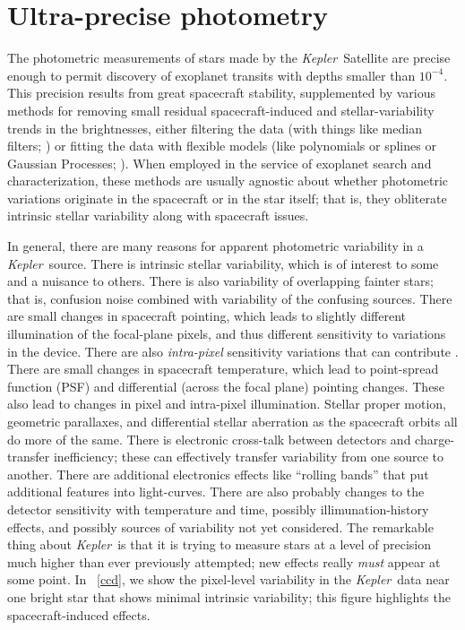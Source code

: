 \documentclass[12pt, preprint]{aastex}
\newcommand{\project}[1]{\textsl{#1}}
\newcommand{\Kepler}{\project{Kepler}}
\begin{document}
\section{Ultra-precise photometry}

The photometric measurements of stars made by the \Kepler\ Satellite are precise enough
  to permit discovery of exoplanet transits with depths smaller than $10^{-4}$.
This precision results from great spacecraft stability,
  supplemented by various methods for removing small residual spacecraft-induced and stellar-variability trends in the brightnesses,
  either filtering the data (with things like median filters; \cite{trendfilter})
  or fitting the data with flexible models (like polynomials or splines or Gaussian Processes; 
  \cite{gaussian}).
When employed in the service of exoplanet search and characterization,
  these methods are usually agnostic about whether photometric variations originate in the spacecraft or in the star itself;
  that is, they obliterate intrinsic stellar variability along with spacecraft issues.

In general, there are many reasons for apparent photometric variability in a \Kepler\ source.
There is intrinsic stellar variability,
  which is of interest to some and a nuisance to others.
There is also variability of overlapping fainter stars;
  that is, confusion noise combined with variability of the confusing sources.
There are small changes in spacecraft pointing,
  which leads to slightly different illumination of the focal-plane pixels,
  and thus different sensitivity to variations in the device.
There are also \emph{intra-pixel} sensitivity variations that can contribute \citep{whitepaper}.
There are small changes in spacecraft temperature,
  which lead to point-spread function (PSF) and differential (across the focal plane) pointing changes.
These also lead to changes in pixel and intra-pixel illumination.
Stellar proper motion, geometric parallaxes, and differential stellar aberration as the spacecraft orbits all do more of the same.
There is electronic cross-talk between detectors and charge-transfer inefficiency;
  these can effectively transfer variability from one source to another.
There are additional electronics effects like ``rolling bands'' that put additional features into light-curves.
There are also probably changes to the detector sensitivity with temperature and time,
  possibly illimunation-history effects,
  and possibly sources of variability not yet considered.
The remarkable thing about \Kepler\ is that it is trying to measure stars at a level of precision
  much higher than ever previously attempted;
  new effects really \emph{must} appear at some point.
In \figurename~\ref{ccd}, we show the pixel-level variability in the \Kepler\ data
  near one bright star that shows minimal intrinsic variability;
  this figure highlights the spacecraft-induced effects.
\end{document}
